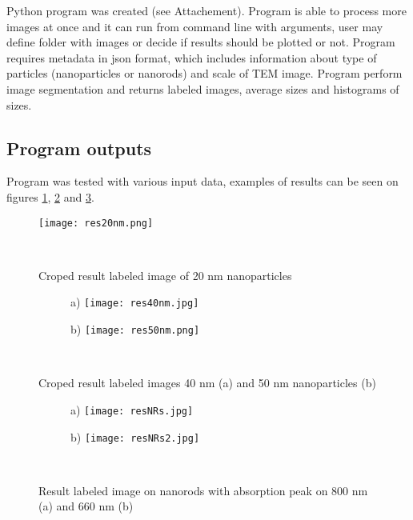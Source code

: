 Python program was created (see Attachement). Program is able to process more images at once and it can run from command line with arguments, user may define folder with images or decide if results should be plotted or not. Program requires metadata in json format, which includes information about type of particles (nanoparticles or nanorods) and scale of TEM image. Program perform image segmentation and returns labeled images, average sizes and histograms of sizes.

\subsection{Program outputs}\label{outputs}

Program was tested with various input data, examples of results can be seen on figures \ref{fig:res20nm}, \ref{fig:res40nm} and \ref{fig:resNRs}.

\begin{figure}[h!]
\begin{center}
    \texttt{[image: res20nm.png]}
    \caption{Croped result labeled image of 20 nm nanoparticles}~\label{fig:res20nm}
\end{center}
\end{figure}

\begin{figure}[h!]
\begin{center}
\begin{subfigure}(a)
    \texttt{[image: res40nm.jpg]}
\end{subfigure}
\begin{subfigure}(b)
    \texttt{[image: res50nm.png]}
\end{subfigure}
    \caption{Croped result labeled images 40 nm (a) and 50 nm nanoparticles (b)}~\label{fig:res40nm}
\end{center}
\end{figure}

\begin{figure}[h!]
\begin{center}
\begin{subfigure}(a)
    \texttt{[image: resNRs.jpg]}
\end{subfigure}
\begin{subfigure}(b)
    \texttt{[image: resNRs2.jpg]}
\end{subfigure}
    \caption{Result labeled image on nanorods with absorption peak on 800 nm (a) and 660 nm (b)}~\label{fig:resNRs}
\end{center}
\end{figure}

